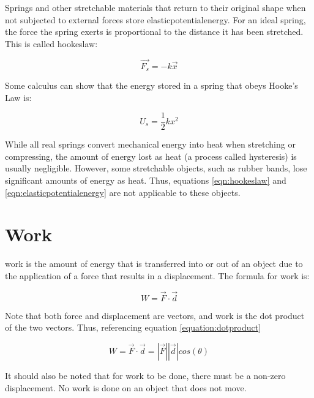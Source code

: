 	Springs and other stretchable materials that return to their original shape when not subjected to external forces store \gls{elasticpotentialenergy}.  For an ideal spring, the force the spring exerts is proportional to the distance it has been stretched.  This is called \gls{hookeslaw}: 
	
		\begin{mdframed}[backgroundcolor=orange!20!white]
		\begin{equation}
		\overrightarrow{F_s} = -k\vec{x}
		\label{eqn:hookeslaw}
		\end{equation}
	\end{mdframed}
	
	Some calculus can show that the energy stored in a spring that obeys Hooke's Law is: 
	
	\begin{mdframed}[backgroundcolor=orange!20!white]
		\begin{equation}
		U_s = \frac{1}{2}kx^2
		\label{eqn:elasticpotentialenergy}
		\end{equation}
	\end{mdframed}

	While all real springs convert mechanical energy into heat when stretching or compressing, the amount of energy lost as heat (a process called hysteresis) is usually negligible.  However, some stretchable objects, such as rubber bands, lose significant amounts of energy as heat.  Thus, equations \ref{eqn:hookeslaw} and \ref{eqn:elasticpotentialenergy} are not applicable to these objects.  
	
	\section{Work} 
\gls{work} is the amount of energy that is transferred into or out of an object due to the application of a force that results in a displacement.  The formula for work is:

\begin{mdframed}[backgroundcolor=orange!20!white]
	\begin{equation}
		W = \vec{F}\cdot\vec{d}  
		\label{eqn:work}
	\end{equation}
\end{mdframed}

Note that both force and displacement are vectors, and work is the dot product of the two vectors.  Thus, referencing equation \ref{equation:dotproduct}
\begin{mdframed}[backgroundcolor=orange!20!white]
	\begin{equation}
		W = \vec{F}\cdot\vec{d}  = |\vec{F}| |\vec{d}| cos (\theta)
		\label{eqn:workdotproduct}
	\end{equation}
\end{mdframed}	
It should also be noted that for work to be done, there must be a non-zero displacement.  No work is done on an object that does not move.  

